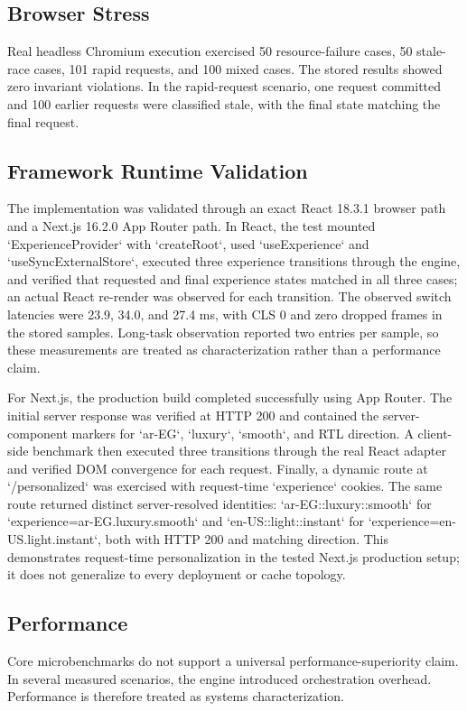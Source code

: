 \documentclass[manuscript,anonymous]{acmart}
\begin{document}
\subsection{Browser Stress}
Real headless Chromium execution exercised 50 resource-failure cases, 50 stale-race cases,
101 rapid requests, and 100 mixed cases. The stored results showed zero invariant violations.
In the rapid-request scenario, one request committed and 100 earlier requests were classified
stale, with the final state matching the final request.

\subsection{Framework Runtime Validation}
The implementation was validated through an exact React 18.3.1 browser path and a Next.js 16.2.0 App Router path. In React, the test mounted `ExperienceProvider` with `createRoot`, used `useExperience` and `useSyncExternalStore`, executed three experience transitions through the engine, and verified that requested and final experience states matched in all three cases; an actual React re-render was observed for each transition. The observed switch latencies were 23.9, 34.0, and 27.4 ms, with CLS 0 and zero dropped frames in the stored samples. Long-task observation reported two entries per sample, so these measurements are treated as characterization rather than a performance claim.

For Next.js, the production build completed successfully using App Router. The initial server response was verified at HTTP 200 and contained the server-component markers for `ar-EG`, `luxury`, `smooth`, and RTL direction. A client-side benchmark then executed three transitions through the real React adapter and verified DOM convergence for each request. Finally, a dynamic route at `/personalized` was exercised with request-time `experience` cookies. The same route returned distinct server-resolved identities: `ar-EG::luxury::smooth` for `experience=ar-EG.luxury.smooth` and `en-US::light::instant` for `experience=en-US.light.instant`, both with HTTP 200 and matching direction. This demonstrates request-time personalization in the tested Next.js production setup; it does not generalize to every deployment or cache topology.

\subsection{Performance}
Core microbenchmarks do not support a universal performance-superiority claim. In several
measured scenarios, the engine introduced orchestration overhead. Performance is therefore
treated as systems characterization.
\end{document}
